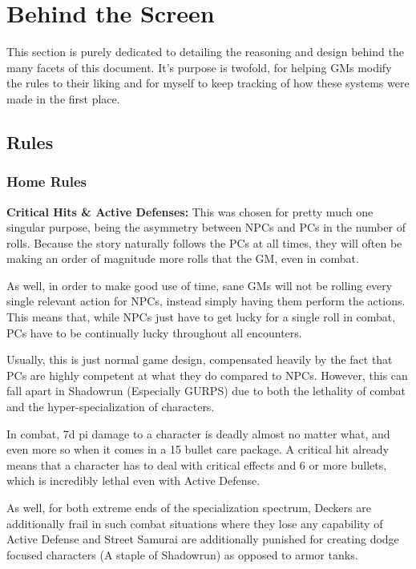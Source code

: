 \section{Behind the Screen} \label{behind_the_screen}

\begin{multicols*}{2}
	
	This section is purely dedicated to detailing the reasoning and design behind the many facets of this document. It's purpose is twofold, for helping GMs modify the rules to their liking and for myself to keep tracking of how these systems were made in the first place.
	
	\subsection{Rules}
	
	\subsubsection{Home Rules}
	
	\textbf{Critical Hits \& Active Defenses:} This was chosen for pretty much one singular purpose, being the asymmetry between NPCs and PCs in the number of rolls. Because the story naturally follows the PCs at all times, they will often be making an order of magnitude more rolls that the GM, even in combat. 
	
	As well, in order to make good use of time, sane GMs will not be rolling every single relevant action for NPCs, instead simply having them perform the actions. This means that, while NPCs just have to get lucky for a single roll in combat, PCs have to be continually lucky throughout all encounters. 
	
	Usually, this is just normal game design, compensated heavily by the fact that PCs are highly competent at what they do compared to NPCs. However, this can fall apart in Shadowrun (Especially GURPS) due to both the lethality of combat and the hyper-specialization of characters.
	
	In combat, 7d pi damage to a character is deadly almost no matter what, and even more so when it comes in a 15 bullet care package. A critical hit already means that a character has to deal with critical effects and 6 or more bullets, which is incredibly lethal even with Active Defense.
	
	As well, for both extreme ends of the specialization spectrum, Deckers are additionally frail in such combat situations where they lose any capability of Active Defense and Street Samurai are additionally punished for creating dodge focused characters (A staple of Shadowrun) as opposed to armor tanks.
	

\end{multicols*}
